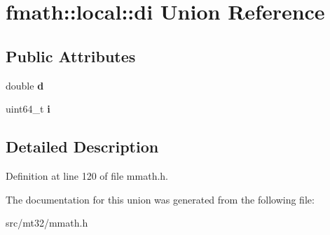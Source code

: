 \hypertarget{unionfmath_1_1local_1_1di}{\section{fmath\-:\-:local\-:\-:di Union Reference}
\label{unionfmath_1_1local_1_1di}
}
\subsection*{Public Attributes}
\begin{DoxyCompactItemize}
\item 
\hypertarget{unionfmath_1_1local_1_1di_acb476477a540e16d6165446a477950a2}{double {\bfseries d}}\label{unionfmath_1_1local_1_1di_acb476477a540e16d6165446a477950a2}

\item 
\hypertarget{unionfmath_1_1local_1_1di_ab6f8af8ccb0597bd7048485a43c5e739}{uint64\-\_\-t {\bfseries i}}\label{unionfmath_1_1local_1_1di_ab6f8af8ccb0597bd7048485a43c5e739}

\end{DoxyCompactItemize}


\subsection{Detailed Description}


Definition at line 120 of file mmath.\-h.



The documentation for this union was generated from the following file\-:\begin{DoxyCompactItemize}
\item 
src/mt32/mmath.\-h\end{DoxyCompactItemize}
